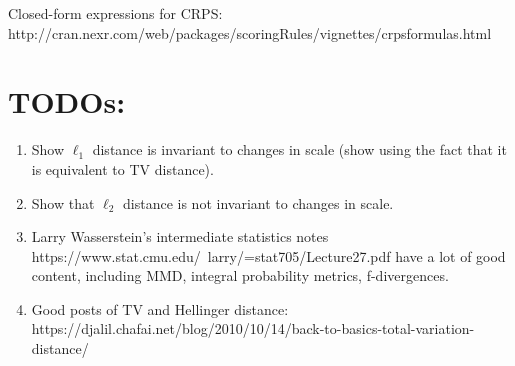 \documentclass[12pt]{article}
\begin{document}
Closed-form expressions for CRPS: http://cran.nexr.com/web/packages/scoringRules/vignettes/crpsformulas.html



\section{TODOs:}
\begin{enumerate}
\item Show $\ell_1$ distance is invariant to changes in scale (show using the fact that it is equivalent to TV distance). 
\item Show that $\ell_2$ distance is not invariant to changes in scale. 
\item Larry Wasserstein's intermediate statistics notes https://www.stat.cmu.edu/~larry/=stat705/Lecture27.pdf have a lot of good content, including MMD, integral probability metrics, f-divergences. 
\item Good posts of TV and Hellinger distance: https://djalil.chafai.net/blog/2010/10/14/back-to-basics-total-variation-distance/
\end{enumerate}
\end{document}
